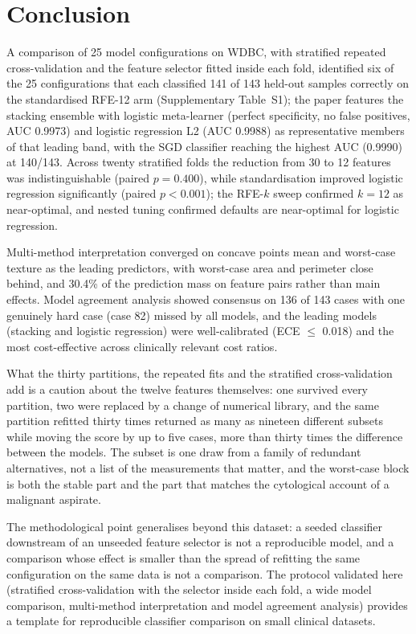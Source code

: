 \documentclass[review,12pt]{elsarticle}
\begin{document}
\section{Conclusion}

A comparison of 25 model configurations on WDBC, with stratified repeated cross-validation and the feature selector fitted inside each fold, identified six of the 25 configurations that each classified 141 of 143 held-out samples correctly on the standardised RFE-12 arm (Supplementary Table~S1); the paper features the stacking ensemble with logistic meta-learner (perfect specificity, no false positives, AUC 0.9973) and logistic regression L2 (AUC 0.9988) as representative members of that leading band, with the SGD classifier reaching the highest AUC (0.9990) at 140/143. Across twenty stratified folds the reduction from 30 to 12 features was indistinguishable (paired $p=0.400$), while standardisation improved logistic regression significantly (paired $p<0.001$); the RFE-$k$ sweep confirmed $k=12$ as near-optimal, and nested tuning confirmed defaults are near-optimal for logistic regression.

Multi-method interpretation converged on concave points mean and worst-case texture as the leading predictors, with worst-case area and perimeter close behind, and 30.4\% of the prediction mass on feature pairs rather than main effects. Model agreement analysis showed consensus on 136 of 143 cases with one genuinely hard case (case 82) missed by all models, and the leading models (stacking and logistic regression) were well-calibrated (ECE $\leq$ 0.018) and the most cost-effective across clinically relevant cost ratios.

What the thirty partitions, the repeated fits and the stratified cross-validation add is a caution about the twelve features themselves: one survived every partition, two were replaced by a change of numerical library, and the same partition refitted thirty times returned as many as nineteen different subsets while moving the score by up to five cases, more than thirty times the difference between the models. The subset is one draw from a family of redundant alternatives, not a list of the measurements that matter, and the worst-case block is both the stable part and the part that matches the cytological account of a malignant aspirate.

The methodological point generalises beyond this dataset: a seeded classifier downstream of an unseeded feature selector is not a reproducible model, and a comparison whose effect is smaller than the spread of refitting the same configuration on the same data is not a comparison. The protocol validated here (stratified cross-validation with the selector inside each fold, a wide model comparison, multi-method interpretation and model agreement analysis) provides a template for reproducible classifier comparison on small clinical datasets.
\end{document}
